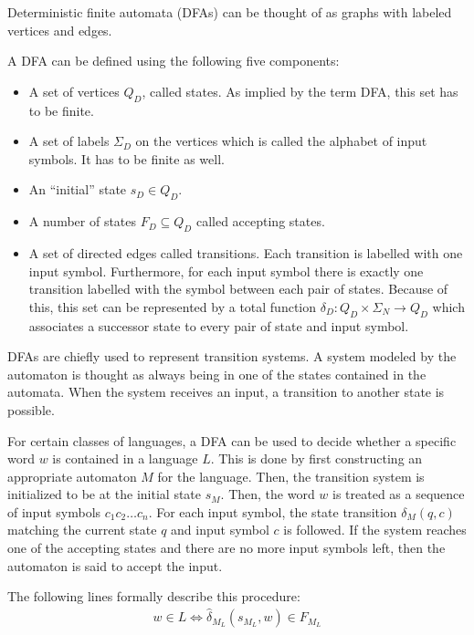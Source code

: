Deterministic finite automata (DFAs) can be thought of as graphs with labeled vertices and edges.

\begin{definition}
    A DFA can be defined using the following five components:

    \begin{itemize}
        \item A set of vertices $Q_D$, called states.
        As implied by the term DFA, this set has to be finite.
        \item A set of labels $\Sigma_D$ on the vertices which is called the alphabet of input symbols.
        It has to be finite as well.
        \item An ``initial'' state $s_D \in Q_D$.
        \item A number of states $F_D \subseteq Q_D$ called accepting states.
        \item A set of directed edges called transitions.
        Each transition is labelled with one input symbol.
        Furthermore, for each input symbol there is exactly one transition labelled with
        the symbol between each pair of states.
        Because of this, this set can be represented by a total function
        $\delta_D : Q_D \times \Sigma_N \rightarrow Q_D$ which associates a successor state to
        every pair of state and input symbol.
    \end{itemize}
\end{definition}

DFAs are chiefly used to represent transition systems.
A system modeled by the automaton is thought as always being in one of the states contained in the automata.
When the system receives an input, a transition to another state is possible.

For certain classes of languages, a DFA can be used to decide whether a specific word $w$ is contained in a language $L$.
This is done by first constructing an appropriate automaton $M$ for the language.
Then, the transition system is initialized to be at the initial state $s_{M}$.
Then, the word $w$ is treated as a sequence of input symbols $c_1 c_2 \ldots c_n$.
For each input symbol, the state transition $\delta_{M}(q, c)$ matching the current state $q$ and input symbol $c$ is followed.
If the system reaches one of the accepting states and there are no more input symbols left, then the
automaton is said to accept the input.

The following lines formally describe this procedure:
\begin{align}
    w \in L \Leftrightarrow \hat\delta_{M_L}(s_{M_L}, w) \in F_{M_L}
\end{align}

